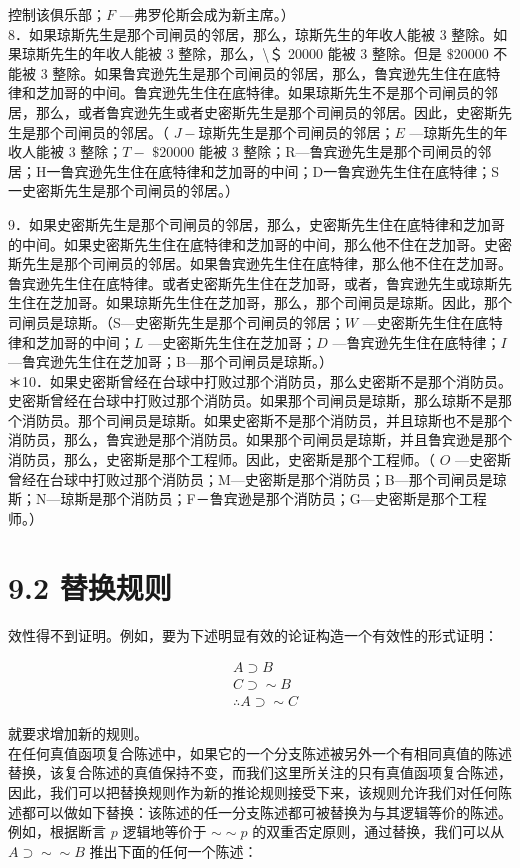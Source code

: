 控制该俱乐部；$F$ —弗罗伦斯会成为新主席。）\\
8．如果琼斯先生是那个司闸员的邻居，那么，琼斯先生的年收人能被 3 整除。如果琼斯先生的年收人能被 3 整除，那么，\textbackslash ＄ 20000 能被 3 整除。但是 $\$ 20000$ 不能被 3 整除。如果鲁宾逊先生是那个司闸员的邻居，那么，鲁宾逊先生住在底特律和芝加哥的中间。鲁宾逊先生住在底特律。如果琼斯先生不是那个司闸员的邻居，那么，或者鲁宾逊先生或者史密斯先生是那个司闸员的邻居。因此，史密斯先生是那个司闸员的邻居。（ $J-$琼斯先生是那个司闸员的邻居；$E$ —琼斯先生的年收人能被 3 整除；$T-$ $\$ 20000$ 能被 3 整除；R—鲁宾逊先生是那个司闸员的邻居；H一鲁宾逊先生住在底特律和芝加哥的中间；D一鲁宾逊先生住在底特律；S一史密斯先生是那个司闸员的邻居。）

9．如果史密斯先生是那个司闸员的邻居，那么，史密斯先生住在底特律和芝加哥的中间。如果史密斯先生住在底特律和芝加哥的中间，那么他不住在芝加哥。史密斯先生是那个司闸员的邻居。如果鲁宾逊先生住在底特律，那么他不住在芝加哥。鲁宾逊先生住在底特律。或者史密斯先生住在芝加哥，或者，鲁宾逊先生或琼斯先生住在芝加哥。如果琼斯先生住在芝加哥，那么，那个司闸员是琼斯。因此，那个司闸员是琼斯。（S—史密斯先生是那个司闸员的邻居；$W$ —史密斯先生住在底特律和芝加哥的中间；$L$ —史密斯先生住在芝加哥；$D$ —鲁宾逊先生住在底特律；$I$ —鲁宾逊先生住在芝加哥；B—那个司闸员是琼斯。）\\
＊10．如果史密斯曾经在台球中打败过那个消防员，那么史密斯不是那个消防员。史密斯曾经在台球中打败过那个消防员。如果那个司闸员是琼斯，那么琼斯不是那个消防员。那个司闸员是琼斯。如果史密斯不是那个消防员，并且琼斯也不是那个消防员，那么，鲁宾逊是那个消防员。如果那个司闸员是琼斯，并且鲁宾逊是那个消防员，那么，史密斯是那个工程师。因此，史密斯是那个工程师。（ $O$ —史密斯曾经在台球中打败过那个消防员；M—史密斯是那个消防员；B—那个司闸员是琼斯；N—琼斯是那个消防员；F－鲁宾逊是那个消防员；G—史密斯是那个工程师。）

\section*{9.2 替换规则}
效性得不到证明。例如，要为下述明显有效的论证构造一个有效性的形式证明：

$$
\begin{aligned}
& A \supset B \\
& C \supset \sim B \\
& \therefore A \supset \sim C
\end{aligned}
$$

就要求增加新的规则。\\
在任何真值函项复合陈述中，如果它的一个分支陈述被另外一个有相同真值的陈述替换，该复合陈述的真值保持不变，而我们这里所关注的只有真值函项复合陈述，因此，我们可以把替换规则作为新的推论规则接受下来，该规则允许我们对任何陈述都可以做如下替换：该陈述的任一分支陈述都可被替换为与其逻辑等价的陈述。例如，根据断言 $p$ 逻辑地等价于 $\sim \sim p$ 的双重否定原则，通过替换，我们可以从 $A \supset \sim \sim B$ 推出下面的任何一个陈述：

